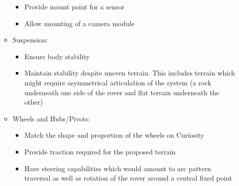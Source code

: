 \begin{itemize}
\begin{itemize}
\begin{itemize}
            \item Provide mount point for a sensor
            \item Allow mounting of a camera module
          \end{itemize}
          \item Suspension:
          \begin{itemize}
            \item Ensure body stability
            \item Maintain stability despite uneven terrain. This includes terrain which might require asymmetrical articulation of the system (a rock underneath one side of the rover and flat terrain underneath the other)
          \end{itemize}
          \item Wheels and Hubs/Pivots:
          \begin{itemize}
            \item Match the shape and proportion of the wheels on Curiosity
            \item Provide traction required for the proposed terrain
            \item Have steering capabilities which would amount to arc pattern traversal as well as rotation of the rover around a central fixed point
          \end{itemize}
        \end{itemize}
        

\end{itemize}
